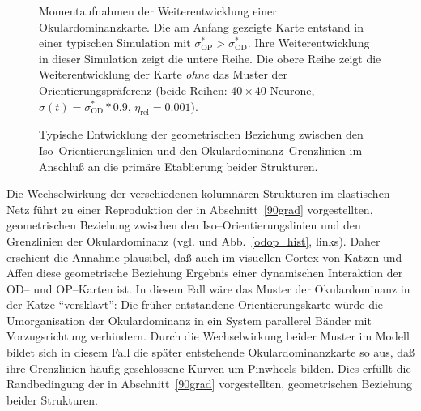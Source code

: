 \begin{figure}[p]
\begin{center}
\begin{sideways}
\end{sideways}
\end{center}
\caption{Momentaufnahmen der Weiterentwicklung einer Okulardominanzkarte.
Die am Anfang gezeigte Karte entstand in einer typischen Simulation mit
$\sigma^\ast_{\text{OP}}>\sigma^\ast_{\text{OD}}$. Ihre Weiterentwicklung in
dieser Simulation zeigt die untere Reihe. Die obere Reihe zeigt die
Weiterentwicklung der Karte \emph{ohne} das Muster der
Orientierungspräferenz (beide Reihen: $40\times 40$ Neurone,
$\sigma(t)=\sigma^\ast_{\text{OD}}*0.9$, $\eta_{\text{rel}}=0.001$).}
\label{oddev}
\end{figure}

\begin{figure}[p]
\begin{center}
\begin{sideways}
\end{sideways}
\end{center}
\caption{Typische Entwicklung der geometrischen Beziehung zwischen den
Iso--Orientierungslinien und den Okulardominanz--Grenzlinien im Anschluß
an die primäre Etablierung beider Strukturen.}
\label{angledev}
\end{figure}

Die Wechselwirkung der verschiedenen kolumnären Strukturen im elastischen
Netz führt zu einer Reproduktion der in Abschnitt~\ref{90grad}
vorgestellten, geometrischen Beziehung zwischen den
Iso--Orientierungslinien und den Grenzlinien der Okulardominanz
(vgl.  und Abb.~\ref{odop_hist}, links). Daher
erschient die Annahme plausibel, daß auch im visuellen Cortex von Katzen
und Affen diese geometrische Beziehung Ergebnis einer dynamischen
Interaktion der OD-- und OP--Karten ist. In diesem Fall wäre das Muster
der Okulardominanz in der Katze ``versklavt'': Die früher entstandene
Orientierungskarte würde die Umorganisation der Okulardominanz in ein
System parallerel Bänder mit Vorzugsrichtung verhindern.  Durch die
Wechselwirkung beider Muster im Modell bildet sich in diesem Fall die
später entstehende Okulardominanzkarte so aus, daß ihre Grenzlinien
häufig geschlossene Kurven um Pinwheels bilden. Dies erfüllt die
Randbedingung der in Abschnitt~\ref{90grad} vorgestellten, geometrischen
Beziehung beider Strukturen.

